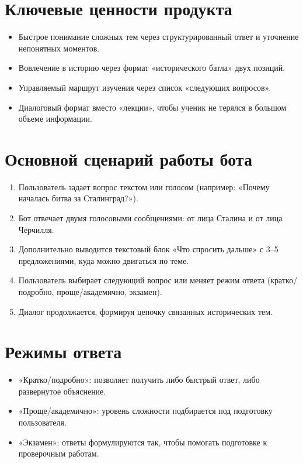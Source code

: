 \documentclass[a4paper,14pt]{extarticle}
\begin{document}
    \section{Ключевые ценности продукта}
    \begin{itemize}
        \item Быстрое понимание сложных тем через структурированный ответ и уточнение непонятных моментов.
        \item Вовлечение в историю через формат «исторического батла» двух позиций.
        \item Управляемый маршрут изучения через список «следующих вопросов».
        \item Диалоговый формат вместо «лекции», чтобы ученик не терялся в большом объеме информации.
    \end{itemize}

    \section{Основной сценарий работы бота}
    \begin{enumerate}
        \item Пользователь задает вопрос текстом или голосом (например: «Почему началась битва за Сталинград?»).
        \item Бот отвечает двумя голосовыми сообщениями: от лица Сталина и от лица Черчилля.
        \item Дополнительно выводится текстовый блок «Что спросить дальше» с 3–5 предложениями, куда можно двигаться по теме.
        \item Пользователь выбирает следующий вопрос или меняет режим ответа (кратко/подробно, проще/академично, экзамен).
        \item Диалог продолжается, формируя цепочку связанных исторических тем.
    \end{enumerate}

    \section{Режимы ответа}
    \begin{itemize}
        \item «Кратко/подробно»: позволяет получить либо быстрый ответ, либо развернутое объяснение.
        \item «Проще/академично»: уровень сложности подбирается под подготовку пользователя.
        \item «Экзамен»: ответы формулируются так, чтобы помогать подготовке к проверочным работам.
    \end{itemize}
\end{document}

